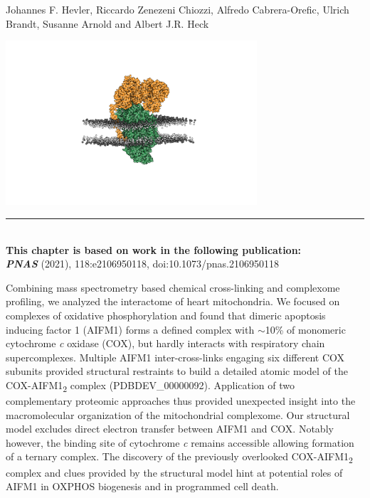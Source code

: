  \label{ch-3}
\vspace*{0.25cm}

\footnotesize Johannes F. Hevler, Riccardo Zenezeni Chiozzi, Alfredo Cabrera-Orefic, Ulrich Brandt, Susanne Arnold and Albert J.R. Heck
%
\begin{center}
	\vspace{1.125cm}
	\includegraphics[width=0.7\textwidth]{Chapter.3/Figures/COX_AIFM1_Goodshell_like.png}
	\vspace{0.25cm}
\end{center}
%
\begin{flushleft}
	\vspace*{\fill}
	\rule{\textwidth}{1pt}\\[0cm]
	\textbf{This chapter is based on work in the following publication:}\\
	\footnotesize
	\textbf{\emph{PNAS}} (2021), 118:e2106950118, doi:10.1073/pnas.2106950118\\
	\footnotesize
\end{flushleft}
\begin{abstract102}
	Combining mass spectrometry based chemical cross-linking and complexome profiling, we analyzed the interactome of heart mitochondria. We focused on complexes of oxidative phosphorylation and found that dimeric apoptosis inducing factor 1 (AIFM1) forms a defined complex with $\sim$10\% of monomeric cytochrome \emph{c} oxidase (COX), but hardly interacts with respiratory chain supercomplexes. Multiple AIFM1 inter-cross-links engaging six different COX subunits provided structural restraints to build a detailed atomic model of the COX-AIFM1\textsubscript{2} complex (PDBDEV\_00000092). Application of two complementary proteomic approaches thus provided unexpected insight into the macromolecular organization of the mitochondrial complexome. Our structural model excludes direct electron transfer between AIFM1 and COX. Notably however, the binding site of cytochrome \emph{c} remains accessible allowing formation of a ternary complex. The discovery of the previously overlooked COX-AIFM1\textsubscript{2} complex and clues provided by the structural model hint at potential roles of AIFM1 in OXPHOS biogenesis and in programmed cell death.
\end{abstract102}
